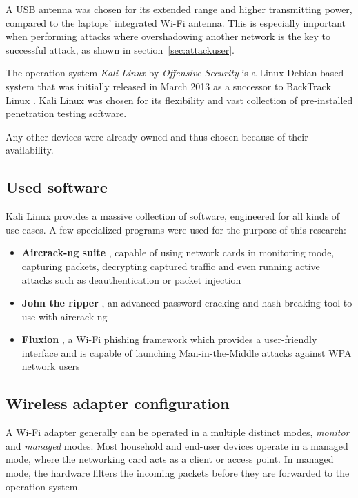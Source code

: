 A USB antenna was chosen for its extended range and higher transmitting power, compared to the laptops' integrated Wi-Fi antenna. This is especially important when performing attacks where overshadowing another network is the key to successful attack, as shown in section~\ref{sec:attackuser}.

The operation system \emph{Kali Linux} by \emph{Offensive Security} is a Linux Debian-based system that was initially released in March 2013 as a successor to BackTrack Linux \cite{OffSecDoc17}. Kali Linux was chosen for its flexibility and vast collection of pre-installed penetration testing software.

Any other devices were already owned and thus chosen because of their availability.

\subsection{Used software}

Kali Linux provides a massive collection of software, engineered for all kinds of use cases. A few specialized programs were used for the purpose of this research:

\begin{itemize}

\item{\textbf{Aircrack-ng suite} \cite{AirNg17}, capable of using network cards in monitoring mode, capturing packets, decrypting captured traffic and even running active attacks such as deauthentication or packet injection}

\item{\textbf{John the ripper} \cite{Openwall17}, an advanced password-cracking and hash-breaking tool to use with aircrack-ng}

\item{\textbf{Fluxion} \cite{Fluxion17}, a Wi-Fi phishing framework which provides a user-friendly interface and is capable of launching Man-in-the-Middle attacks against WPA network users}

\end{itemize}

\subsection{Wireless adapter configuration}

A Wi-Fi adapter generally can be operated in a multiple distinct modes, \emph{monitor} and \emph{managed} modes. Most household and end-user devices operate in a managed mode, where the networking card acts as a client or access point. In managed mode, the hardware filters the incoming packets before they are forwarded to the operation system. 

